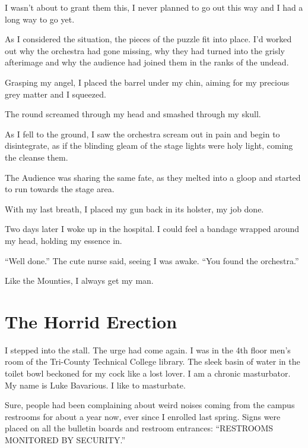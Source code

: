 I wasn't about to grant them this, I never planned to go out
this way and I had a long way to go yet.

As I considered the situation, the pieces of the puzzle fit into
place. I'd worked out why the orchestra had gone missing, why
they had turned into the grisly afterimage and why the audience had
joined them in the ranks of the undead.



Grasping my angel, I placed the barrel under my chin, aiming for my
precious grey matter and I squeezed.



The round screamed through my head and smashed through my
skull.



As I fell to the ground, I saw the orchestra scream out in pain and
begin to disintegrate, as if the blinding gleam of the stage lights
were holy light, coming the cleanse them.

The Audience was sharing the same fate, as they melted into a gloop
and started to run towards the stage area.

With my last breath, I placed my gun back in its holster, my job
done.



Two days later I woke up in the hospital. I could feel a bandage
wrapped around my head, holding my essence in.



``Well done.'' The cute nurse said, seeing I was awake.
``You found the orchestra.''



Like the Mounties, I always get my man. 

 



\chapter{The Horrid Erection}


I stepped into the stall. The urge had come again. I was in the 4th
floor men's room of the Tri-County Technical College library.
The sleek basin of water in the toilet bowl beckoned for my cock
like a lost lover. I am a chronic masturbator. My name is Luke
Bavarious. I like to masturbate.



Sure, people had been complaining about weird noises coming from
the campus restrooms for about a year now, ever since I enrolled
last spring. Signs were placed on all the bulletin boards and
restroom entrances: ``RESTROOMS MONITORED BY
SECURITY.''



